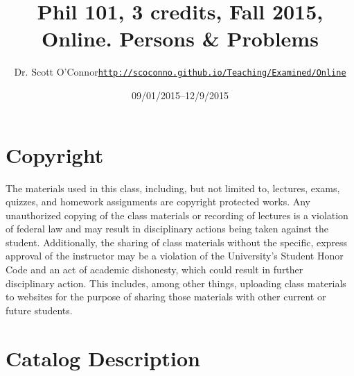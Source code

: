 \documentclass[article,oneside]{memoir}
\def\myauthor{Author}
\def\mytitle{Title}
\def\mycopyright{\myauthor}
\def\myweb{\href{http://scoconno.github.io/Teaching/Examined/Online}{http://scoconno.github.io/Teaching/Examined/Online}}
\def\myauthor{Dr. Scott O'Connor}
\def\mytitle{{\normalsize Phil 101, 3 credits, Fall 2015, Online. \newline} \HUGE Persons \& Problems}
\begin{document}
\setsansfont[Mapping=tex-text]{Myriad Pro} 
\setmonofont[Mapping=tex-text,Scale=0.8]{Georgia} 

\def\ind{\hangindent=1 true cm\hangafter=1 \noindent}
\def\labelitemi{$\cdot$}


\title{\LARGE \mytitle}     
\author{\Large\myauthor \newline \footnotesize\texttt{\noindent\myweb}}
\date{09/01/2015--12/9/2015}

\published{\today}

\maketitle




%
%

\section{Copyright}
The materials used in this class, including, but not limited to, lectures, exams, quizzes, and homework assignments are copyright protected works.  Any unauthorized copying of the class materials or recording of lectures is a violation of federal law and may result in disciplinary actions being taken against the student.  Additionally, the sharing of class materials without the specific, express approval of the instructor may be a violation of the University's Student Honor Code and an act of academic dishonesty, which could result in further disciplinary action.  This includes, among other things, uploading class materials to websites for the purpose of sharing those materials with other current or future students. 

\section{Catalog Description}
\end{document}
